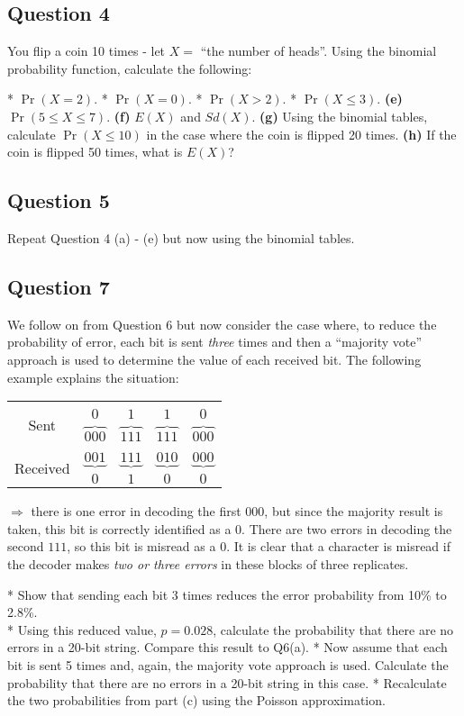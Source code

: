
\subsection*{Question 4}

You flip a coin 10 times - let $X =$ ``the number of heads''. Using the binomial probability function, calculate the following:

*  $\Pr(X = 2)$. 
 *  $\Pr(X = 0)$. 
 *   $\Pr(X > 2)$. 
 *  $\Pr(X \le 3)$. 
 {\bf(e)} $\Pr(5 \le X \le 7)$.  
 {\bf(f)} $E(X)$ and $Sd(X)$. 
 {\bf(g)} Using the binomial tables, calculate $\Pr(X \le10)$ in the case where the coin is flipped 20 times. 
 {\bf(h)} If the coin is flipped 50 times, what is $E(X)$?

\subsection*{Question 5}

Repeat Question 4 (a) - (e) but now using the binomial tables.




\subsection*{Question 7}
We follow on from Question 6 but now consider the case where, to reduce the probability of error, each bit is sent \emph{three} times and then a ``majority vote'' approach is used to determine the value of each received bit. The following example explains the situation:\\[-0.5cm]
\begin{center}
\begin{tabular}{ccccc}
\hline
&&&&\\[-0.3cm]
\multirow{2}{*}{Sent} & $0$ & $1$ & $1$ & $0$ \\
& $\overbrace{000}$ & $\overbrace{111}$ & $\overbrace{111}$ & $\overbrace{000}$ \\[0.2cm]
\hline
&&&&\\[-0.3cm]
\multirow{2}{*}{Received} & $\underbrace{001}$ & $\underbrace{111}$ & $\underbrace{010}$ & $\underbrace{000}$ \\
& $0$ & $1$ & $0$ & $0$ \\[0.2cm]
\hline
\end{tabular}
\end{center}
$\Rightarrow$ there is one error in decoding the first $000$, but since the majority result is taken, this bit is correctly identified as a $0$. There are two errors in decoding the second $111$, so this bit is misread as a $0$. It is clear that a character is misread if the decoder makes \emph{two or three errors} in these blocks of three replicates.

*  Show that sending each bit 3 times reduces the error probability from 10\% to 2.8\%. 
\\ *  Using this reduced value, $p=0.028$, calculate the probability that there are no errors in a 20-bit string. Compare this result to Q6(a). 
 *  Now assume that each bit is sent 5 times and, again, the majority vote approach is used. Calculate the probability that there are no errors in a 20-bit string in this case. %
 *  Recalculate the two probabilities from part (c) using the Poisson approximation.
